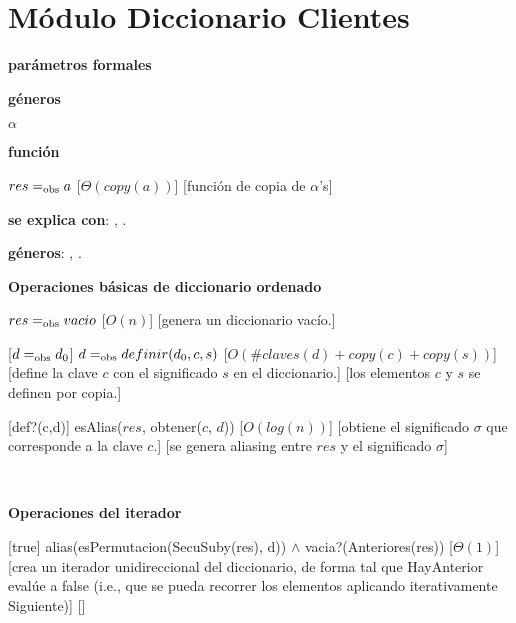 \section{Módulo Diccionario Clientes}


\begin{Interfaz}
  
  \textbf{parámetros formales}\parindent\\
  \parbox{1.7cm}{\textbf{géneros}} $\alpha$\\
  \parbox[t]{1.7cm}{\textbf{función}}\parbox[t]{\textwidth-2\parindent-1.7cm}{%
    {$res =_{\mathrm{obs}} a$}
    [$\Theta(copy(a))$]
    [función de copia de $\alpha$'s]
  }

  \textbf{se explica con}: , .

  \textbf{géneros}: , .

  \textbf{Operaciones básicas de diccionario ordenado}

  {$res =_{\mathrm{obs}} vacio$}%
  [$O(n)$]
  [genera un diccionario vacío.]

  [$d =_{\mathrm{obs}} d_0$]
  {$d =_{\mathrm{obs}} definir(d_0, c, s)$}
  [$O(\#claves(d) + copy(c) + copy(s))$]
  [define la clave $c$ con el significado $s$ en el diccionario.]
  [los elementos $c$ y $s$ se definen por copia.]
  
  [def?(c,d)]
  {esAlias($res$, obtener($c$, $d$))}
  [$O(log(n))$]
  [obtiene el significado $\sigma$ que corresponde a la clave $c$.]
  [se genera aliasing entre $res$ y el significado $\sigma$]
  
  ~

  \textbf{Operaciones del iterador}

  [true]
  {alias(esPermutacion(SecuSuby(res), d)) $\land$ vacia?(Anteriores(res))}
  [$\Theta(1)$]
  [crea un iterador unidireccional del diccionario, de forma tal que HayAnterior evalúe a false (i.e., que se pueda recorrer los elementos aplicando iterativamente Siguiente)]
  []
	

\end{Interfaz}

